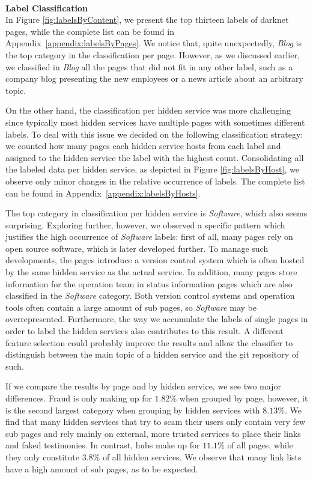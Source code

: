 \documentclass[USenglish,oneside,twocolumn]{article}
\newcommand{\sh}[1]{\noindent\vspace{0.5\baselineskip}\\ \textbf{#1}\\}
\begin{document}
\sh{Label Classification}
In Figure \ref{fig:labelsByContent}, we present the top thirteen labels of darknet pages, while the complete list can be found in Appendix~\ref{appendix:labelsByPages}. 
We notice that, quite unexpectedly, \emph{Blog} is the top category in the classification per page. However, as we discussed earlier, we classified in \emph{Blog} all the pages that did not fit in any other label, such as a company blog presenting the new employees or a news article about an arbitrary topic.

On the other hand, the classification per hidden service was more challenging since typically most hidden services have multiple pages with sometimes different labels. To deal with this issue we decided on the following classification strategy: we counted how many pages each hidden service hosts from each label and assigned to the hidden service the label with the highest count. Consolidating all the labeled data per hidden service, as depicted in Figure \ref{fig:labelsByHost}, we observe only minor changes in the relative occurrence of labels. The complete list can be found in Appendix~\ref{appendix:labelsByHosts}.

The top category in classification per hidden service is \emph{Software}, which also seems surprising. 
Exploring further, however, we observed a specific pattern which justifies the high occurrence of \emph{Software} labels:
first of all, many pages rely on open source software, which is later developed further. To manage such developments, the pages introduce a version control system which is often hosted by the same hidden service as the actual service. In addition, many pages store information for the operation team in status information pages which are also classified in the \emph{Software} category. Both version control systems and operation tools often contain a large amount of sub pages, so \emph{Software} may be overrepresented. 
Furthermore, the way we accumulate the labels of single pages in order to label the hidden services also contributes to this result. A different feature selection could probably improve the results and allow the classifier to distinguish between the main topic of a hidden service and the git repository of such.

If we compare the results by page and by hidden service, we see two major differences. Fraud is only making up for $1.82\%$ when grouped by page, however, it is the second largest category when grouping by hidden services with $8.13\%$. We find that many hidden services that try to scam their users only contain very few sub pages and rely mainly on external, more trusted services to place their links and faked testimonies.
In contrast, hubs make up for $11.1\%$ of all pages, while they only constitute $3.8\%$ of all hidden services. We observe that many link lists have a high amount of sub pages, as to be expected.
\end{document}
